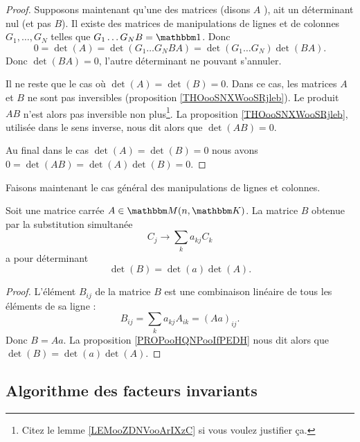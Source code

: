 \begin{proof}
    Supposons maintenant qu'une des matrices (disons \( A \) ), ait un déterminant nul (et pas \( B \)). Il existe des matrices de manipulations de lignes et de colonnes \( G_1,\ldots, G_N\) telles que \( G_1\ldots G_NB=\mtu\). Donc
    \begin{equation}
        0=\det(A)=\det(G_1\ldots G_NBA)=\det(G_1\ldots G_N)\det(BA).
    \end{equation}
    Donc \( \det(BA)=0\), l'autre déterminant ne pouvant s'annuler.

    Il ne reste que le cas où \( \det(A)=\det(B)=0\). Dans ce cas, les matrices \( A\) et \( B\) ne sont pas inversibles (proposition \ref{THOooSNXWooSRjleb}). Le produit \( AB\) n'est alors pas inversible non plus\footnote{Citez le lemme \ref{LEMooZDNVooArIXzC} si vous voulez justifier ça.}. La proposition \ref{THOooSNXWooSRjleb}, utilisée dans le sens inverse, nous dit alors que \( \det(AB)=0\).

    Au final dans le cas \( \det(A)=\det(B)=0\) nous avons \( 0=\det(AB)=\det(A)\det(B)=0\).
\end{proof}

Faisons maintenant le cas général des manipulations de lignes et colonnes.

\begin{proposition}     \label{PROPooSLLGooSZjQrv}
    Soit une matrice carrée \( A\in \eM(n,\eK)\). La matrice \( B\) obtenue par la substitution simultanée
    \begin{equation}
        C_j\to \sum_ka_{kj}C_k
    \end{equation}
    a pour déterminant
    \begin{equation}
        \det(B)=\det(a)\det(A).
    \end{equation}
\end{proposition}

\begin{proof}
    L'élément \( B_{ij}\) de la matrice \( B\) est une combinaison linéaire de tous les éléments de sa ligne :
    \begin{equation}
        B_{ij}=\sum_ka_{kj}A_{ik}=(Aa)_{ij}.
    \end{equation}
    Donc \( B=Aa\). La proposition \ref{PROPooHQNPooIfPEDH} nous dit alors que \( \det(B)=\det(a)\det(A)\).
\end{proof}

\subsection{Algorithme des facteurs invariants}

